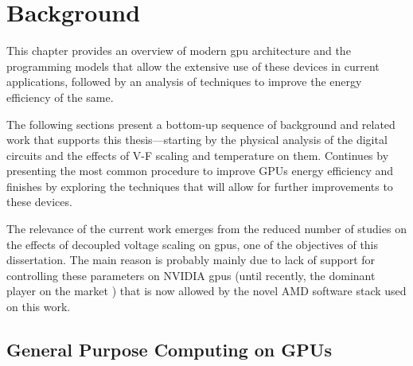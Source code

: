 
\chapter{Background}
\label{chapter:background}

This chapter provides an overview of modern \acrshort{gpu} architecture and the programming models that allow the extensive use of these devices in current applications, followed by an analysis of techniques to improve the energy efficiency of the same. 

The following sections present a bottom-up sequence of background and related work that supports this thesis—starting by the physical analysis of the digital circuits and the effects of V-F scaling and temperature on them. Continues by presenting the most common procedure to improve GPUs energy efficiency and finishes by exploring the techniques that will allow for further improvements to these devices. 

The relevance of the current work emerges from the reduced number of studies on the effects of decoupled voltage scaling on \acrshort{gpu}s, one of the objectives of this dissertation. The main reason is probably mainly due to lack of support for controlling these parameters on NVIDIA \acrshort{gpu}s (until recently, the dominant player on the market \cite{noauthor_jon_2018} \cite{mujtaba_amd_2019}) that is now allowed by the novel AMD software stack used on this work.






\section{General Purpose Computing on GPUs}
\label{section:gpp_gpu}

